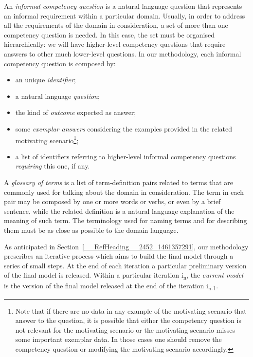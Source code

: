 \documentclass[runningheads,a4paper]{llncs}
\begin{document}
An {\em informal competency question} \cite{__RefNumPara__2389_1461357291} is a natural language question that represents an informal requirement within a particular domain. Usually, in order to address all the requirements of the domain in consideration, a set of more than one competency question is needed. In this case, the set must be organised hierarchically: we will have higher-level competency questions that require answers to other much lower-level questions. In our methodology, each informal competency question is composed by:
\begin{itemize}
\item an unique {\em identifier};
\item a natural language {\em question};
\item the kind of {\em outcome} expected as answer;
\item some {\em exemplar answers} considering the examples provided in the related motivating scenario\footnote{Note that if there are no data in any example of the motivating scenario that answer to the question, it is possible that either the competency question is not relevant for the motivating scenario or the motivating scenario misses some important exemplar data. In those cases one should remove the competency question or modifying the motivating scenario accordingly.};
\item a list of identifiers referring to higher-level informal competency questions {\em requiring} this one, if any.
\end{itemize}

A {\em glossary of terms} \cite{__RefNumPara__2434_1461357291}{\em }is a list of term-definition pairs related to terms that are commonly used for talking about the domain in consideration. The term in each pair may be composed by one or more words or verbs, or even by a brief sentence, while the related definition is a natural language explanation of the meaning of such term. The terminology used for naming terms and for describing them must be as close as possible to the domain language.

As anticipated in Section~\ref{__RefHeading__2452_1461357291}, our methodology prescribes an iterative process which aims to build the final model through a series of small steps. At the end of each iteration a particular preliminary version of the final model is released. Within a particular iteration i\textsubscript{n}, the {\em current model} is the version of the final model released at the end of the iteration i\textsubscript{n-1}.
\end{document}
